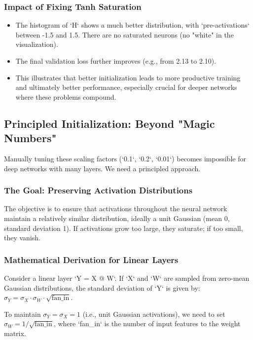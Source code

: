 \subsubsection{Impact of Fixing Tanh Saturation}
\begin{itemize}
    \item The histogram of `H` shows a much better distribution, with `pre-activations` between -1.5 and 1.5. There are no saturated neurons (no "white" in the visualization).
    \item The final validation loss further improves (e.g., from 2.13 to 2.10).
    \item This illustrates that better initialization leads to more productive training and ultimately better performance, especially crucial for deeper networks where these problems compound.
\end{itemize}

\subsection{Principled Initialization: Beyond "Magic Numbers"}

Manually tuning these scaling factors (`0.1`, `0.2`, `0.01`) becomes impossible for deep networks with many layers. We need a principled approach.

\subsubsection{The Goal: Preserving Activation Distributions}
The objective is to ensure that activations throughout the neural network maintain a relatively similar distribution, ideally a unit Gaussian (mean 0, standard deviation 1). If activations grow too large, they saturate; if too small, they vanish.

\subsubsection{Mathematical Derivation for Linear Layers}
Consider a linear layer `Y = X @ W`. If `X` and `W` are sampled from zero-mean Gaussian distributions, the standard deviation of `Y` is given by:
$\sigma_Y = \sigma_X \cdot \sigma_W \cdot \sqrt{\text{fan\_in}}$.

To maintain $\sigma_Y = \sigma_X = 1$ (i.e., unit Gaussian activations), we need to set $\sigma_W = 1 / \sqrt{\text{fan\_in}}$, where `fan_in` is the number of input features to the weight matrix.

